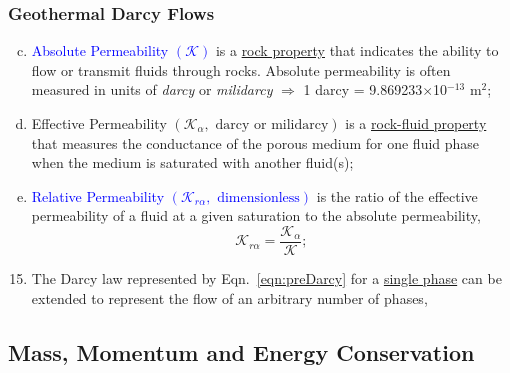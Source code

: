 \documentclass[10pt,compress]{beamer}
\newcommand{\frc}{\displaystyle\frac}
\newcommand{\blue}{\textcolor{blue}}
\begin{document}
\begin{frame}
 \frametitle{Geothermal Darcy Flows}
    \begin{enumerate}[(a)]\setcounter{enumi}{2} \scriptsize
       \item <1-> \blue{Absolute Permeability $\left(\mathcal{K}\right)$} is a \underline{rock property} that indicates the ability to flow or transmit fluids through rocks. Absolute permeability is often measured in units of {\it darcy} or {\it milidarcy} $\Longrightarrow$ 1 darcy = 9.869233$\times$10$^{−13}$ m$^{2}$;
       \item <2-> Effective Permeability $\left(\mathcal{K}_{\alpha},\text{ darcy or milidarcy}\right)$ is a \underline{rock-fluid property} that measures the conductance of the porous medium for one fluid phase when the medium is saturated with another fluid(s);
       \item <3->  \blue{Relative Permeability $\left(\mathcal{K}_{r\alpha},\text{ dimensionless}\right)$} is the ratio of the effective permeability of a fluid at a given saturation to the absolute permeability,  
          \begin{equation}
             \mathcal{K}_{r\alpha} = \frc{\mathcal{K}_{\alpha}}{\mathcal{K}};
          \end{equation}
    \end{enumerate}

    \begin{enumerate}[1.]\setcounter{enumi}{14} \scriptsize
       \item <4-> The Darcy law represented by Eqn.~\ref{eqn:preDarcy} for a \underline{single phase} can be extended to represent the flow of an arbitrary number of phases,
          \visible<4->{\begin{equation}
            \underline{\dot{Q}}_{\alpha} = - \mathcal{K} \frc{\mathcal{K}_{r\alpha}\rho_{\alpha}}{\mu_{\alpha}} \left(\nabla P_{\alpha} - \rho_{\alpha} \underline{g}\right);\label{eqn:ExtendedDarcy}
          \end{equation}}
    \end{enumerate}

\end{frame}


\subsection{Mass, Momentum and Energy Conservation}
\end{document}

